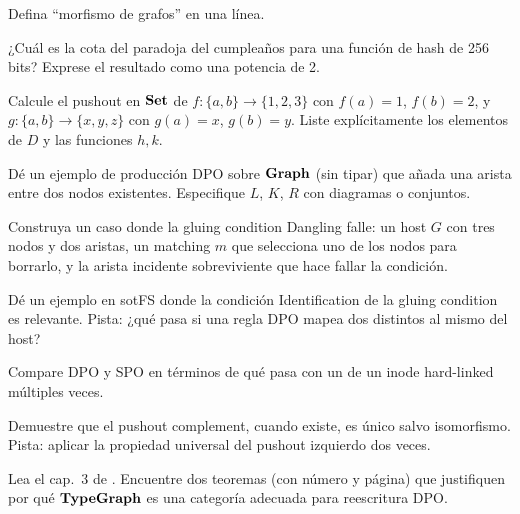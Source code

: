 \begin{ejercicio}[\dificultad{$\star$}]
\label{ej:prelim-1}
Defina ``morfismo de grafos'' en una línea.
\end{ejercicio}

\begin{ejercicio}[\dificultad{$\star$}]
\label{ej:prelim-2}
¿Cuál es la cota del paradoja del cumpleaños para una función de hash
de 256 bits? Exprese el resultado como una potencia de 2.
\end{ejercicio}

\begin{ejercicio}[\dificultad{$\star\star$}]
\label{ej:prelim-3}
Calcule el pushout en $\mathbf{Set}$ de $f: \{a,b\} \to \{1,2,3\}$ con $f(a) = 1$,
$f(b) = 2$, y $g: \{a,b\} \to \{x,y,z\}$ con $g(a) = x$, $g(b) = y$.
Liste explícitamente los elementos de $D$ y las funciones $h, k$.
\end{ejercicio}

\begin{ejercicio}[\dificultad{$\star\star$}]
\label{ej:prelim-4}
Dé un ejemplo de producción DPO sobre $\mathbf{Graph}$ (sin tipar) que añada
una arista entre dos nodos existentes. Especifique $L$, $K$, $R$ con
diagramas o conjuntos.
\end{ejercicio}

\begin{ejercicio}[\dificultad{$\star\star$}]
\label{ej:prelim-5}
Construya un caso donde la gluing condition Dangling falle: un host
$G$ con tres nodos y dos aristas, un matching $m$ que selecciona uno
de los nodos para borrarlo, y la arista incidente sobreviviente que
hace fallar la condición.
\end{ejercicio}

\begin{ejercicio}[\dificultad{$\star\star$}]
\label{ej:prelim-6}
Dé un ejemplo en sotFS donde la condición Identification de la gluing
condition es relevante. Pista: ¿qué pasa si una regla DPO mapea dos
\NDir{} distintos al mismo \NDir{} del host?
\end{ejercicio}

\begin{ejercicio}[\dificultad{$\star\star$}]
\label{ej:prelim-7}
Compare DPO y SPO en términos de qué pasa con un \opunlink{} de un
inode hard-linked múltiples veces.
\end{ejercicio}

\begin{ejercicio}[\dificultad{$\star\star\star$}]
\label{ej:prelim-8}
Demuestre que el pushout complement, cuando existe, es único salvo
isomorfismo. Pista: aplicar la propiedad universal del pushout
izquierdo dos veces.
\end{ejercicio}

\begin{ejercicio}[\dificultad{$\star\star\star$}]
\label{ej:prelim-9}
Lea el cap.~3 de \cite{Ehrig2006}. Encuentre dos teoremas (con número
y página) que justifiquen por qué $\mathbf{TypeGraph}$ es una categoría adecuada
para reescritura DPO.
\end{ejercicio}

